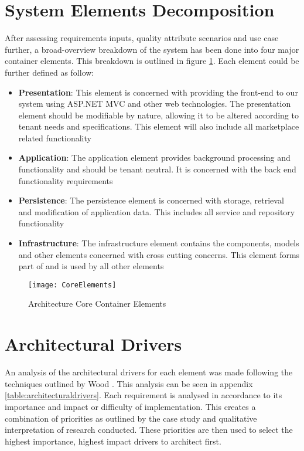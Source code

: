 \section{System Elements Decomposition}
After assessing requirements inputs, quality attribute scenarios and use case further, a broad-overview breakdown of the system has been done into four major container elements. This breakdown is outlined in figure \ref{fig:elements}. Each element could be further defined as follow:
\begin{itemize}
\item \textbf{Presentation}: This element is concerned with providing the front-end to our system using ASP.NET MVC and other web technologies. The presentation element should be modifiable by nature, allowing it to be altered according to tenant needs and specifications. This element will also include all marketplace related functionality
\item \textbf{Application}: The application element provides background processing and functionality and should be tenant neutral. It is concerned with the back end functionality requirements
\item \textbf{Persistence}: The persistence element is concerned with storage, retrieval and modification of application data. This includes all service and repository functionality
\item \textbf{Infrastructure}: The infrastructure element contains the components, models and other elements concerned with cross cutting concerns. This element forms part of and is used by all other elements
\end{itemize}

\begin{figure}
\centering
\texttt{[image: CoreElements]}
\caption{Architecture Core Container Elements}
\label{fig:elements}
\end{figure}


\section{Architectural Drivers}
 \label{sec:arcdrivers}
An analysis of the architectural drivers for each element was made following the techniques outlined by Wood \cite{Wood2007}. This analysis can be seen in appendix \ref{table:architecturaldrivers}.  Each requirement is analysed in accordance to its importance and impact or difficulty of implementation. This creates a combination of priorities as outlined by the case study and qualitative interpretation of research conducted. These priorities are then used to select the highest importance, highest impact drivers to architect first. 

